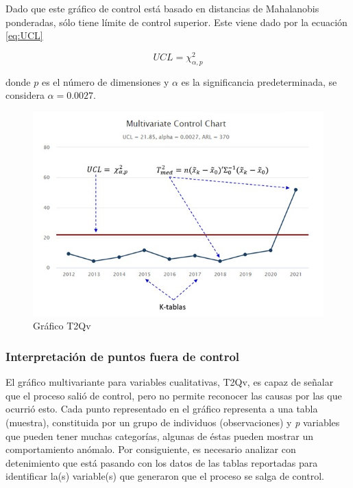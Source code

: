 \documentclass[mathematics,article,submit,moreauthors,pdftex]{mdpi}
\begin{document}
Dado que este gráfico de control está basado en distancias de
Mahalanobis ponderadas, sólo tiene límite de control superior. Este
viene dado por la ecuación \ref{eq:UCL}

\begin{equation}
UCL=\chi^2_{\alpha,p}
\label{eq:UCL}
\end{equation}

donde \(p\) es el número de dimensiones y \(\alpha\) es la significancia
predeterminada, se considera \(\alpha=0.0027\).

\begin{figure}[!h]


\begin{center}\includegraphics[width=0.7\linewidth,]{t2qvesq} \end{center}

\caption{Gráfico T2Qv}

\label{fig:t2qvesq}
\end{figure}

\hypertarget{interpretaciuxf3n-de-puntos-fuera-de-control}{%
\subsubsection{Interpretación de puntos fuera de
control}\label{interpretaciuxf3n-de-puntos-fuera-de-control}}

El gráfico multivariante para variables cualitativas, T2Qv, es capaz de
señalar que el proceso salió de control, pero no permite reconocer las
causas por las que ocurrió esto. Cada punto representado en el gráfico
representa a una tabla (muestra), constituida por un grupo de individuos
(observaciones) y \emph{p} variables que pueden tener muchas categorías,
algunas de éstas pueden mostrar un comportamiento anómalo. Por
consiguiente, es necesario analizar con detenimiento que está pasando
con los datos de las tablas reportadas para identificar la(s)
variable(s) que generaron que el proceso se salga de control.
\end{document}
